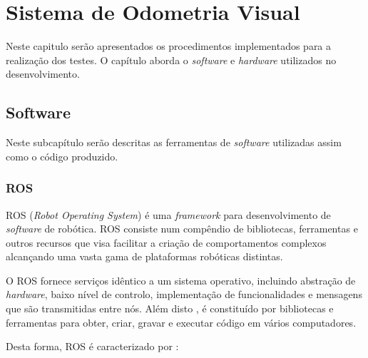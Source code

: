 \chapter{Sistema de Odometria Visual} \label{chap:sist}

Neste capitulo serão apresentados os procedimentos implementados para a realização dos testes. O capítulo aborda o \textit{software} e \textit{hardware} utilizados no desenvolvimento.

\section{Software}

Neste subcapítulo serão descritas as ferramentas de \textit{software} utilizadas assim como o código produzido.

\subsection{ROS}

ROS (\textit{Robot Operating System}) é uma \textit{framework} para desenvolvimento de \textit{software} de robótica. ROS consiste num compêndio de bibliotecas, ferramentas e outros recursos que visa facilitar a criação de comportamentos complexos alcançando uma vasta gama de plataformas robóticas distintas. 

O ROS fornece serviços idêntico a um sistema operativo, incluindo abstração de \textit{hardware}, baixo nível de controlo, implementação de funcionalidades e mensagens que são transmitidas entre nós. Além disto , é constituído por bibliotecas e ferramentas para obter, criar, gravar e executar código em vários computadores. 

Desta forma, ROS  é caracterizado por :

